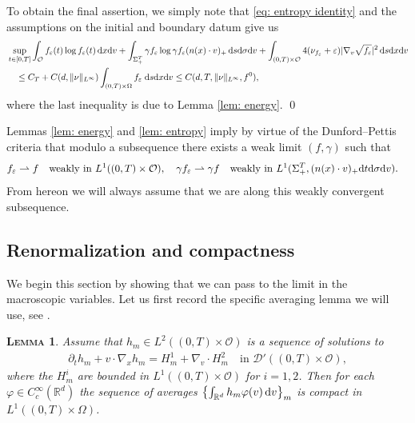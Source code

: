 \documentclass[10pt, reqno]{amsart}
\theoremstyle{plain}
\newtheorem{lemma}[theorem]{\normalfont \scshape Lemma}
\theoremstyle{definition}
\theoremstyle{remark}
\renewenvironment{proof}[1][\proofname]{\noindent{\scshape #1.\quad}}{\qed}
\numberwithin{equation}{section}
\newcommand{\calD}{\mathcal D}
\newcommand{\calO}{\mathcal O}
\newcommand{\p}{\partial}
\newcommand{\R}{\mathbb{R}}
\newcommand{\ve}{\varepsilon}
\newcommand{\dx}{\textnormal{d}x}
\newcommand{\dv}{\textnormal{d}v}
\newcommand{\dt}{\textnormal{d}t}
\newcommand{\ds}{\textnormal{d}s}
\newcommand{\tnd}{\textnormal{d}}
\newcommand{\weakto}{\rightharpoonup}
\newcommand{\lt}{\left}
\newcommand{\rt}{\right}
\newcommand{\intr}{\int_{\R^d}}
\begin{document}
\begin{proof}
    To obtain the final assertion, we simply note that \eqref{eq: entropy identity} and the assumptions on the initial and boundary datum give us
    \begin{align*}
        &\sup_{t\in [0,T]} \int_{\calO} f_\ve(t) \log f_\ve(t) \,\dx\dv + \int_{\Sigma_+^T} \gamma f_\ve \log \gamma f_\ve (n(x)\cdot v)_+ \,\ds\tnd\sigma\dv  + \int_{(0,T)\times\calO} 4(\nu_{f_\ve} + \ve) |\nabla_v \sqrt{f_\ve}|^2 \,\ds\dx\dv \\
        &\quad\le C_T + C(d,\|\nu\|_{L^\infty}) \int_{(0,T)\times \Omega} f_\ve \;\ds\dx\dv  \le C(d, T, \|\nu\|_{L^\infty}, f^0),
    \end{align*}
    where the last inequality is due to Lemma \ref{lem: energy}. 
\end{proof}

Lemmas \ref{lem: energy} and \ref{lem: entropy} imply by virtue of the Dunford--Pettis criteria that modulo a subsequence there exists a weak limit $(f,\gamma)$ such that
\begin{align*}
    &f_\ve \weakto f \quad \text{weakly in }L^1((0,T)\times \calO), \quad \gamma f_\ve \weakto \gamma f \quad \text{weakly in }L^1(\Sigma_+^T, (n(x)\cdot v)_+ \dt\tnd\sigma\dv).
\end{align*}
From hereon we will always assume that we are along this weakly convergent subsequence.
%
%
%
%
%
%
\subsection{Renormalization and compactness}

We begin this section by showing that we can pass to the limit in the macroscopic variables. Let us first record the specific averaging lemma we will use, see \cite[Theorem 6]{DipernaLionsMeyer}.

\begin{lemma}\label{lem: L2 vel avg}
    Assume that $h_m \in L^2((0,T)\times\calO)$ is a sequence of solutions to
    \begin{align*}
        \p_t h_m + v\cdot \nabla_x h_m = H_m^1 + \nabla_v\cdot H_m^2 \quad \text{in } \calD'((0,T)\times \calO),
    \end{align*}
    where the $H_m^i$ are bounded in $L^1((0,T)\times\calO)$ for $i=1,2$. Then for each $\varphi\in C_c^\infty(\R^d)$ the sequence of averages $\lt\{\intr h_m \varphi(v)\,\dv\rt\}_m$ is compact in $L^1((0,T)\times\Omega)$.
\end{lemma}
\end{document}
